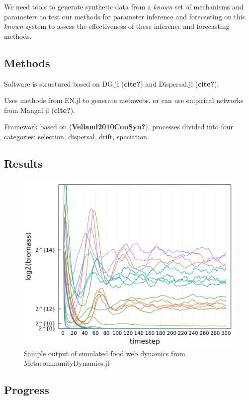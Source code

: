 \documentclass[11pt]{article}
\makeatletter
\def\maxwidth{\ifdim\Gin@nat@width>\linewidth\linewidth
\else\Gin@nat@width\fi}
\let\Oldincludegraphics\includegraphics
\renewcommand{\includegraphics}[1]{\Oldincludegraphics[width=\maxwidth]{#1}}
\makeatother
\begin{document}
We need tools to generate synthetic data from a \emph{known} set of
mechanisms and parameters to test our methods for parameter inference
and forecasting on this \emph{known} system to assess the effectiveness
of these inference and forecasting methods.

\hypertarget{methods-2}{%
\subsection{Methods}\label{methods-2}}

Software is structured based on DG.jl (\textbf{cite?}) and Dispersal.jl
(\textbf{cite?}).

Uses methods from EN.jl to generate metawebs, or can use empirical
networks from Mangal.jl (\textbf{cite?}).

Framework based on (\textbf{Velland2010ConSyn?}), processes divided into
four categories: selection, dispersal, drift, speciation.

\hypertarget{results-2}{%
\subsection{Results}\label{results-2}}

\begin{figure}
\centering
\includegraphics{./figures/foodwebtraj.png}
\caption{Sample output of simulated food web dynamics from
MetacommunityDynamics.jl}
\end{figure}

\hypertarget{progress-2}{%
\subsection{Progress}\label{progress-2}}
\end{document}
